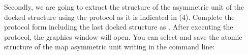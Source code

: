 Secondly, we are going to extract the structure of the asymmetric unit of the docked  structure using the protocol  as it is indicated in  (4). Complete the protocol form including the last docked structure  as . After executing the protocol, the \chimera graphics window will open. You can select and save the atomic structure of the map asymmetric unit writing in the \chimera command line:\\
 \\
 \\
 \\
 \\
 \\
 \\

